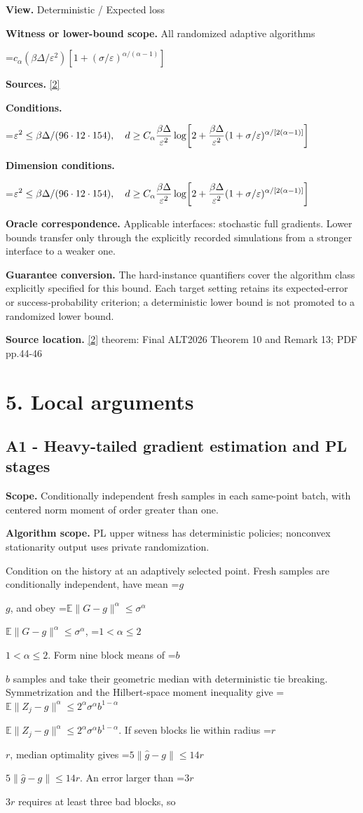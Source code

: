 \documentclass[10pt,a4paper]{article}
\newcommand{\AtlasMath}[1]{\par\begingroup\centering\setbox0=\hbox{$\displaystyle #1$}\ifdim\wd0>1.4\linewidth\typeout{ATLAS WIDE FORMULA: \the\wd0}\fi\ifdim\wd0>\linewidth\resizebox{\linewidth}{!}{\box0}\else\box0\fi\par\endgroup}
\newcommand{\AtlasInlineMath}[1]{\begingroup\setbox0=\hbox{$#1$}\ifdim\wd0>.4\linewidth\endgroup\AtlasMath{#1}\else\endgroup$#1$\fi}
\begin{document}
\textbf{View.} Deterministic / Expected loss

\textbf{Witness or lower-bound scope.} All randomized adaptive algorithms

\AtlasMath{c_\alpha (\beta\Delta/\varepsilon^2)[1+(\sigma/\varepsilon)^{\alpha/(\alpha-1)}]}
\textbf{Sources.} \href{https://proceedings.mlr.press/v313/liu26a.html}{[2]}

\textbf{Conditions.} 
\AtlasMath{\varepsilon^2\le\beta\Delta/(96\cdot12\cdot154),\quad d\ge C_\alpha {\beta\Delta\over\varepsilon^2}\log\!\left[2+{\beta\Delta\over\varepsilon^2}(1+\sigma/\varepsilon)^{\alpha/[2(\alpha-1)]}\right]}


\textbf{Dimension conditions.} 
\AtlasMath{\varepsilon^2\le\beta\Delta/(96\cdot12\cdot154),\quad d\ge C_\alpha {\beta\Delta\over\varepsilon^2}\log\!\left[2+{\beta\Delta\over\varepsilon^2}(1+\sigma/\varepsilon)^{\alpha/[2(\alpha-1)]}\right]}


\textbf{Oracle correspondence.} Applicable interfaces: stochastic full gradients. Lower bounds transfer only through the explicitly recorded simulations from a stronger interface to a weaker one.

\textbf{Guarantee conversion.} The hard-instance quantifiers cover the algorithm class explicitly specified for this bound. Each target setting retains its expected-error or success-probability criterion; a deterministic lower bound is not promoted to a randomized lower bound.

\textbf{Source location.} \href{https://proceedings.mlr.press/v313/liu26a.html}{[2]} theorem: Final ALT2026 Theorem 10 and Remark 13; PDF pp.44-46

\section{5. Local arguments}
\subsection{A1 - Heavy-tailed gradient estimation and PL stages}
\textbf{Scope.} Conditionally independent fresh samples in each same-point batch, with centered norm moment of order greater than one.

\textbf{Algorithm scope.} PL upper witness has deterministic policies; nonconvex stationarity output uses private randomization.

Condition on the history at an adaptively selected point. Fresh samples are conditionally independent, have mean \AtlasInlineMath{g}, and obey
\AtlasInlineMath{\mathbb E\|G-g\|^\alpha\le\sigma^\alpha}, \AtlasInlineMath{1<\alpha\le2}.
Form nine block means of \AtlasInlineMath{b} samples and take their geometric median with deterministic tie breaking. Symmetrization and the Hilbert-space moment inequality give
\AtlasInlineMath{\mathbb E\|Z_j-g\|^\alpha\le2^\alpha\sigma^\alpha b^{1-\alpha}}.
If seven blocks lie within radius \AtlasInlineMath{r}, median optimality gives
\AtlasInlineMath{5\|\widehat g-g\|\le14r}.
An error larger than \AtlasInlineMath{3r} requires at least three bad blocks, so
\end{document}
